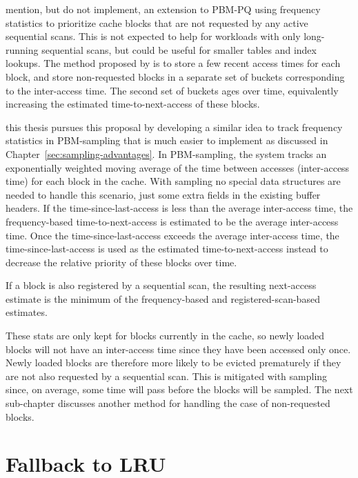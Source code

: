 \citet{pbm} mention, but do not implement, an extension to PBM-PQ using frequency statistics to prioritize cache blocks that are not requested by any active sequential scans. This is not expected to help for workloads with only long-running sequential scans, but could be useful for smaller tables and index lookups. The method proposed by \citet{pbm} is to store a few recent access times for each block, and store non-requested blocks in a separate set of buckets corresponding to the inter-access time. The second set of buckets ages over time, equivalently increasing the estimated time-to-next-access of these blocks.

this thesis pursues this proposal by developing a similar idea to track frequency statistics in PBM-sampling that is much easier to implement as discussed in Chapter~\ref{sec:sampling-advantages}. In PBM-sampling, the system tracks an exponentially weighted moving average of the time between accesses (inter-access time) for each block in the cache. With sampling no special data structures are needed to handle this scenario, just some extra fields in the existing buffer headers. If the time-since-last-access is less than the average inter-access time, the frequency-based time-to-next-access is estimated to be the average inter-access time. Once the time-since-last-access exceeds the average inter-access time, the time-since-last-access is used as the estimated time-to-next-access instead to decrease the relative priority of these blocks over time. 

If a block is also registered by a sequential scan, the resulting next-access estimate is the minimum of the frequency-based and registered-scan-based estimates.

These stats are only kept for blocks currently in the cache, so newly loaded blocks will not have an inter-access time since they have been accessed only once. Newly loaded blocks are therefore more likely to be evicted prematurely if they are not also requested by a sequential scan. This is mitigated with sampling since, on average, some time will pass before the blocks will be sampled. The next sub-chapter discusses another method for handling the case of non-requested blocks.

\section{\label{sec:lru_nr}Fallback to LRU}


